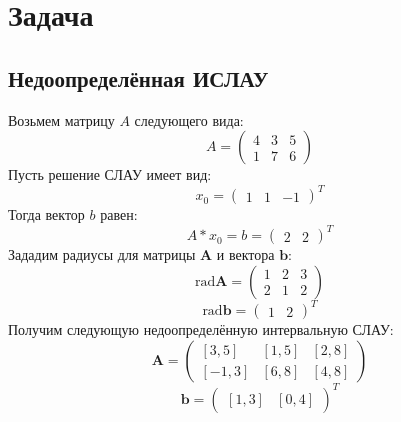 \section{Задача}

\subsection{Недоопределённая ИСЛАУ}
Возьмем матрицу $A$ следующего вида:
\begin{equation}
	A =
	\begin{pmatrix}
		4 & 3 & 5 \\
		1 & 7 & 6
	\end{pmatrix}
\end{equation}
Пусть решение СЛАУ имеет вид:
\begin{equation}
	x_0=
	\begin{pmatrix}
		1 & 1 & -1
	\end{pmatrix}^T
\end{equation}
Тогда вектор $b$ равен:
\begin{equation}
	A*x_0=b=
	\begin{pmatrix}
		2 & 2
	\end{pmatrix}^T
\end{equation}
Зададим радиусы для матрицы $\textbf{A}$ и вектора $\textbf{b}$:
\begin{equation}
	\text{rad} \textbf{A}=
	\begin{pmatrix}
		1 & 2 & 3 \\
		2 & 1 & 2
	\end{pmatrix}
\end{equation}
\begin{equation}
	\text{rad} \textbf{b}=
	\begin{pmatrix}
		1 & 2
	\end{pmatrix}^T
\end{equation}
Получим следующую недоопределённую интервальную СЛАУ:
\begin{equation}
	\textbf{A}=
	\begin{pmatrix}
		[3,5] & [1,5] & [2,8] \\
		[-1,3] & [6,8] & [4,8]
	\end{pmatrix}
\end{equation}
\begin{equation}
	\textbf{b}=
	\begin{pmatrix}
		[1,3] & [0,4]
	\end{pmatrix}^T
\end{equation}


